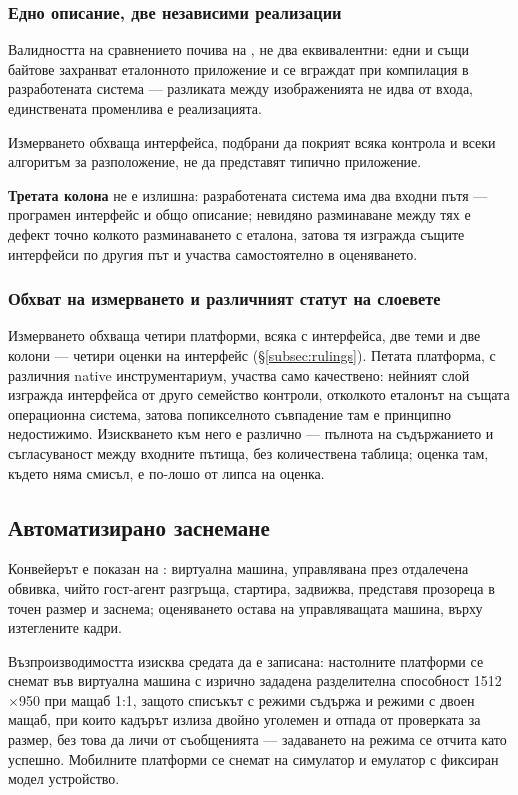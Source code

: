 \subsubsection{Едно описание, две независими реализации}

Валидността на сравнението почива на , не два еквивалентни: едни
и същи байтове захранват еталонното приложение и се вграждат при компилация в
разработената система --- разликата между изображенията не идва от входа, единствената
променлива е реализацията.

Измерването обхваща \boardPages{} интерфейса, подбрани да покрият всяка контрола и
всеки алгоритъм за разположение, не да представят типично приложение.

\textbf{Третата колона} не е излишна: разработената система има два входни пътя ---
програмен интерфейс и общо описание; невидяно разминаване между тях е дефект точно
колкото разминаването с еталона, затова тя изгражда същите интерфейси по другия път и
участва самостоятелно в оценяването.

\subsubsection{Обхват на измерването и различният статут на слоевете}

Измерването обхваща четири платформи, всяка с \boardPages{} интерфейса, две теми и две
колони --- четири оценки на интерфейс (§\ref{subsec:rulings}). Петата платформа, с
различния native инструментариум, участва само качествено: нейният слой изгражда
интерфейса от друго семейство контроли, отколкото еталонът на същата операционна
система, затова попикселното съвпадение там е принципно недостижимо. Изискването към
него е различно --- пълнота на съдържанието и съгласуваност между входните пътища, без
количествена таблица; оценка там, където няма смисъл, е по-лошо от липса на оценка.

\subsection{Автоматизирано заснемане}
\label{subsec:capture}

Конвейерът е показан на : виртуална машина, управлявана
през отдалечена обвивка, чийто гост-агент разгръща, стартира, задвижва, представя
прозореца в точен размер и заснема; оценяването остава на управляващата машина, върху
изтеглените кадри.

Възпроизводимостта изисква средата да е записана: настолните платформи се снемат във
виртуална машина с изрично зададена разделителна способност 1512$\times$950 при мащаб
1:1, защото списъкът с режими съдържа и режими с двоен мащаб, при които кадърът излиза
двойно уголемен и отпада от проверката за размер, без това да личи от съобщенията ---
задаването на режима се отчита като успешно. Мобилните платформи се снемат на
симулатор и емулатор с фиксиран модел устройство.

